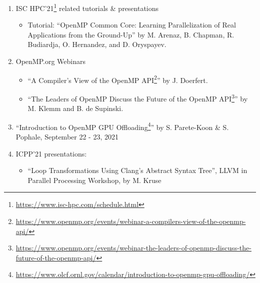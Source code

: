 \begin{enumerate}
\item ISC HPC'21\footnote{\url{https://www.isc-hpc.com/schedule.html}} related tutorials \& presentations
\begin{itemize}
    \item Tutorial: \enquote{OpenMP Common Core: Learning Parallelization of Real Applications from the Ground-Up} by M. Arenaz, B. Chapman, R. Budiardja, O. Hernandez, and D. Oryspayev.
\end{itemize}

\item OpenMP.org Webinars 
\begin{itemize}
    \item \enquote{A Compiler's View of the OpenMP API\footnote{\url{https://www.openmp.org/events/webinar-a-compilers-view-of-the-openmp-api/}}} by J. Doerfert.
    \item \enquote{The Leaders of OpenMP Discuss the Future of the OpenMP API\footnote{\url{https://www.openmp.org/events/webinar-the-leaders-of-openmp-discuss-the-future-of-the-openmp-api/}}} by M. Klemm and B. de Supinski.
\end{itemize}

\item \enquote{Introduction to OpenMP GPU Offloading\footnote{\url{https://www.olcf.ornl.gov/calendar/introduction-to-openmp-gpu-offloading/}}} by S. Parete-Koon \& S. Pophale, September 22 - 23, 2021
   
\item ICPP'21 presentations:
\begin{itemize}
    \item \enquote{Loop Transformations Using Clang’s Abstract Syntax Tree}, LLVM in Parallel Processing Workshop, by M. Kruse
\end{itemize}
      

\end{enumerate}

